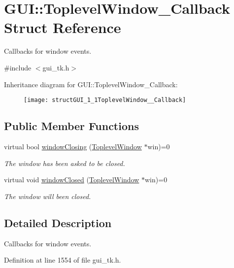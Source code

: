 \hypertarget{structGUI_1_1ToplevelWindow__Callback}{\section{G\-U\-I\-:\-:Toplevel\-Window\-\_\-\-Callback Struct Reference}
\label{structGUI_1_1ToplevelWindow__Callback}
}


Callbacks for window events.  




{\ttfamily \#include $<$gui\-\_\-tk.\-h$>$}

Inheritance diagram for G\-U\-I\-:\-:Toplevel\-Window\-\_\-\-Callback\-:\begin{figure}[H]
\begin{center}
\leavevmode
\texttt{[image: structGUI\_1\_1ToplevelWindow\_\_Callback]}
\end{center}
\end{figure}
\subsection*{Public Member Functions}
\begin{DoxyCompactItemize}
\item 
virtual bool \hyperlink{structGUI_1_1ToplevelWindow__Callback_a3f556e220592d267a7f4d4b79a8f311b}{window\-Closing} (\hyperlink{classGUI_1_1ToplevelWindow}{Toplevel\-Window} $\ast$win)=0
\begin{DoxyCompactList}\small\item\em The window has been asked to be closed. \end{DoxyCompactList}\item 
virtual void \hyperlink{structGUI_1_1ToplevelWindow__Callback_ad02e7827ad3b68f4ea3d0c66fa2a7717}{window\-Closed} (\hyperlink{classGUI_1_1ToplevelWindow}{Toplevel\-Window} $\ast$win)=0
\begin{DoxyCompactList}\small\item\em The window will been closed. \end{DoxyCompactList}\end{DoxyCompactItemize}


\subsection{Detailed Description}
Callbacks for window events. 

Definition at line 1554 of file gui\-\_\-tk.\-h.




